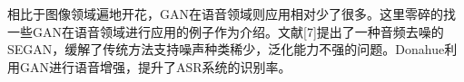 ​
相比于图像领域遍地开花，GAN在语音领域则应用相对少了很多。这里零碎的找一些GAN在语音领域进行应用的例子作为介绍。文献{[}7{]}提出了一种音频去噪的SEGAN，缓解了传统方法支持噪声种类稀少，泛化能力不强的问题。Donahue利用GAN进行语音增强，提升了ASR系统的识别率。










